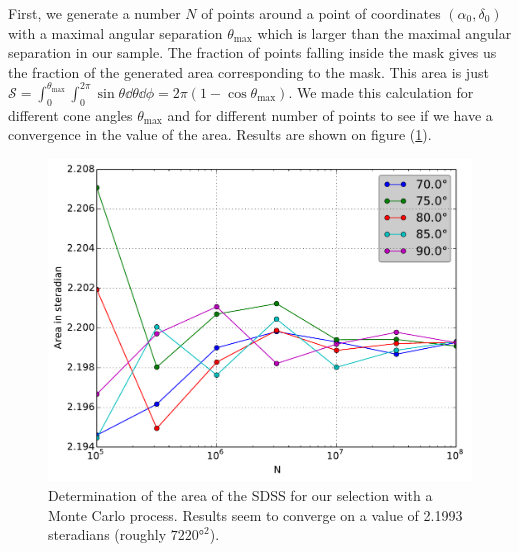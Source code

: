 First, we generate a number $N$ of points around a point of coordinates
$(\alpha_0, \delta_0)$ with a maximal angular separation $\theta_{\max}$
which is larger than the maximal angular separation in our sample. The
fraction of points falling inside the mask gives us the fraction of the
generated area corresponding to the mask. This area is just
$\mathcal{S}=\int_0^{\theta_{\max}}\int_0^{2\pi}\sin\theta\dd{\theta}\dd{\phi}=
2\pi\left(1-\cos\theta_{\max}\right)$. We made this calculation for
different cone angles $\theta_{\max}$ and for different number of points to
see if we have a convergence in the value of the area. Results are shown on
figure (\ref{fig:sdss_area}).
%
\begin{figure}[htb]
    \centering
    \includegraphics[width=0.8\linewidth]{figures/sdss/SDSS_area}
    \caption{Determination of the area of the SDSS for our selection with a
    Monte Carlo process. Results seem to converge on a value of 2.1993
steradians (roughly $7220°^2$).\label{fig:sdss_area}}
\end{figure}
%
